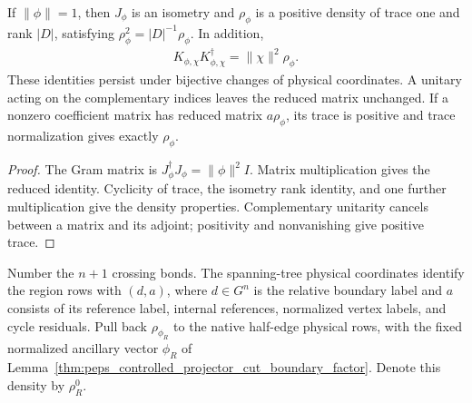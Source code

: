 \begin{lemma}%
    \label{thm:peps_fixed_boundary_factor_density}
    \leanok
    If $\|\phi\|=1$, then $J_\phi$ is an isometry and $\rho_\phi$ is
    a positive density of trace one and rank $|D|$, satisfying
    $\rho_\phi^2=|D|^{-1}\rho_\phi$. In addition,
    \begin{align}
        K_{\phi,\chi}K_{\phi,\chi}^\dagger
        =\|\chi\|^2\rho_\phi.
    \end{align}
    These identities persist under bijective changes of physical coordinates.
    A unitary acting on the complementary indices leaves the reduced matrix
    unchanged. If a nonzero coefficient matrix has reduced matrix
    $a\rho_\phi$, its trace is positive and trace normalization gives
    exactly $\rho_\phi$.
\end{lemma}
\begin{proof}\leanok
    The Gram matrix is $J_\phi^\dagger J_\phi=\|\phi\|^2I$.
    Matrix multiplication gives the reduced identity. Cyclicity of trace,
    the isometry rank identity, and one further multiplication give the
    density properties. Complementary unitarity cancels between a matrix
    and its adjoint; positivity and nonvanishing give positive trace.
\end{proof}

\begin{definition}%
    \label{def:peps_regular_reference_boundary_density}
    \leanok
    Number the $n+1$ crossing bonds. The spanning-tree physical
    coordinates identify the region rows with $(d,a)$, where $d\in G^n$
    is the relative boundary label and $a$ consists of its reference label,
    internal references, normalized vertex labels, and cycle residuals.
    Pull back $\rho_{\phi_R}$ to the native half-edge physical rows, with
    the fixed normalized ancillary vector $\phi_R$ of
    Lemma~\ref{thm:peps_controlled_projector_cut_boundary_factor}.
    Denote this density by $\rho_R^0$.
\end{definition}


